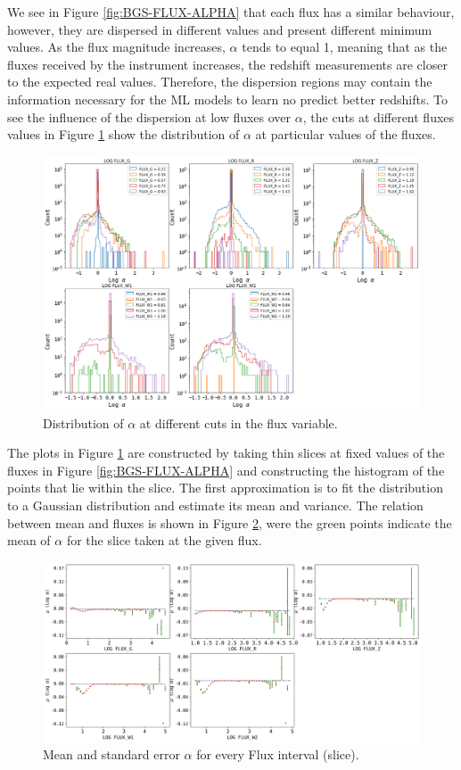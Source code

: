 We see in Figure \ref{fig:BGS-FLUX-ALPHA} that each flux has a similar behaviour, however, they are dispersed in different values and present different minimum values. As the flux magnitude increases, $\alpha$ tends to equal 1, meaning that as the fluxes received by the instrument increases, the redshift measurements are closer to the expected real values. Therefore, the dispersion regions may contain the information necessary for the ML models to learn no predict better redshifts. To see the influence of the dispersion at low fluxes over $\alpha$, the cuts at different fluxes values in Figure \ref{fig:flux_cut_alpha} show the distribution of $\alpha$ at particular values of the fluxes. 
\begin{figure}[h!]
	\centering
	\includegraphics[width=1.0\linewidth]{TeX_files/Imagenes/flux_cut_alpha}
	\caption{Distribution of $\alpha$ at different cuts in the flux variable.}
	\label{fig:flux_cut_alpha}
\end{figure}

The plots in Figure \ref{fig:flux_cut_alpha} are constructed by taking thin slices at fixed values of the fluxes in Figure \ref{fig:BGS-FLUX-ALPHA} and constructing the histogram of the points that lie within the slice. The first approximation is to fit the distribution to a Gaussian distribution and estimate its mean and variance. The relation between mean and fluxes is shown in Figure \ref{fig:media_alpha_flux}, were the green points indicate the mean of $\alpha$ for the slice taken at the given flux. 

\begin{figure}[h!]
	\centering
	\includegraphics[width=1.0\linewidth]{TeX_files/Imagenes/media_alpha_flux}
	\caption{Mean and standard error $\alpha$ for every Flux interval (slice).}
	\label{fig:media_alpha_flux}
\end{figure}

